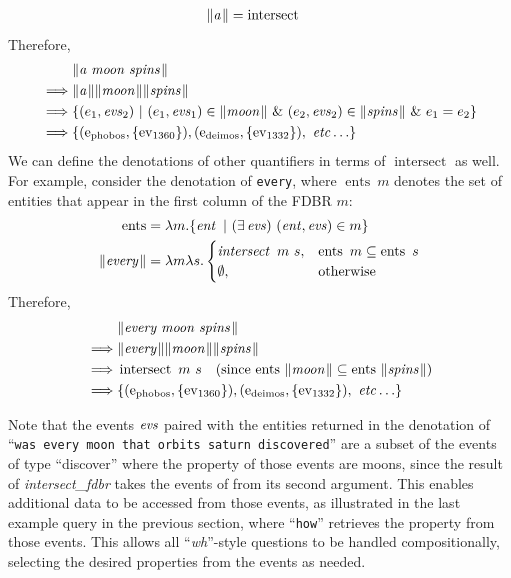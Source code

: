 \documentclass[../main.tex]{subfiles}
\begin{document}
\begin{refsection}
\begin{equation*}
\begin{split}
		\lVert\textit{a\hspace{0.1em}}\rVert &= \operatorname{intersect}
	\end{split}
\end{equation*}
Therefore,
\begin{equation*}
	\begin{split}
		&\meaningof{a\ moon\ spins} \\
		\implies & \meaningof{a} \meaningof{moon} \meaningof{spins} \\
		\implies & \{(e_1,\evs_2)\ |\ (e_1,\evs_1) \in \meaningof{moon}\ \&\ (e_2,\evs_2) \in \meaningof{spins}\ \&\ e_1 = e_2\} \\
		\implies & \{(\entityassoc{phobos}, \{\eventassoc{1360}\}), (\entityassoc{deimos}, \{\eventassoc{1332}\}),\ \etc\}
	\end{split}
\end{equation*}
We can define the denotations of other quantifiers in terms of $\operatorname{intersect}$ as well.  For example, consider the denotation of \texttt{every}, where $\operatorname{ents}\ m$ denotes the set of entities that appear in the first column of the FDBR $m$:
\begin{equation*}
	\begin{split}
		\operatorname{ents} &= \lambda m. \{ \operatorname{\mathit{ent}}\ |\ (\exists \operatorname{\mathit{evs}})\ (\operatorname{\mathit{ent}}, \operatorname{\mathit{evs}}) \in m \} \\
		\lVert\textit{every\hspace{0.1em}}\rVert &= \lambda m \lambda s.
		\begin{cases}
			\operatorname{\mathit{intersect}}\ m\ s, & \operatorname{ents}\ m \subseteq \operatorname{ents}\ s \\
			\emptyset, & \text{otherwise}
		\end{cases}
	\end{split}
\end{equation*}
Therefore,
\begin{equation*}
	\begin{split}
		&\meaningof{every moon spins} \\
		\implies & \meaningof{every} \meaningof{moon} \meaningof{spins} \\
		\implies & \operatorname{intersect}\ m\ s\quad\dmathrm{(since $\operatorname{ents}\ \meaningof{moon} \subseteq \operatorname{ents}\ \meaningof{spins}$)} \\
		\implies & \{(\entityassoc{phobos}, \{\eventassoc{1360}\}), (\entityassoc{deimos}, \{\eventassoc{1332}\}),\ \etc\}
	\end{split}
\end{equation*}

\noindent Note that the events $\operatorname{\mathit{evs}}$ paired with the entities returned in the denotation of ``\texttt{was every moon that orbits saturn discovered}'' are a subset of the events of type ``discover'' where the  property of those events are moons, since the result of \textit{intersect\_fdbr} takes the events of from its second argument. This enables additional data to be accessed from those events, as illustrated in the last example query in the previous section, where ``\texttt{how}'' retrieves the  property from those events.  This allows all ``\textit{wh}''-style questions to be handled compositionally, selecting the desired properties from the events as needed.


\end{refsection}
\end{document}
